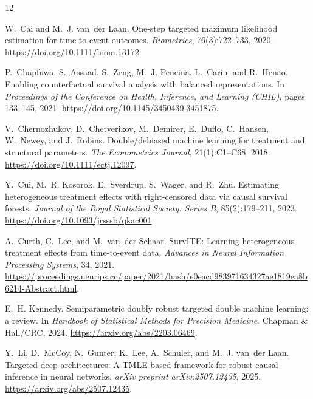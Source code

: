 \documentclass[11pt]{article}
\theoremstyle{remark}
\begin{document}

\begin{thebibliography}{12}

W.~Cai and M.~J. van~der Laan.
\newblock One-step targeted maximum likelihood estimation for time-to-event outcomes.
\newblock \emph{Biometrics}, 76(3):722--733, 2020.
\newblock \url{https://doi.org/10.1111/biom.13172}.

P.~Chapfuwa, S.~Assaad, S.~Zeng, M.~J. Pencina, L.~Carin, and R.~Henao.
\newblock Enabling counterfactual survival analysis with balanced representations.
\newblock In \emph{Proceedings of the Conference on Health, Inference, and Learning (CHIL)}, pages 133--145, 2021.
\newblock \url{https://doi.org/10.1145/3450439.3451875}.

V.~Chernozhukov, D.~Chetverikov, M.~Demirer, E.~Duflo, C.~Hansen, W.~Newey, and J.~Robins.
\newblock Double/debiased machine learning for treatment and structural parameters.
\newblock \emph{The Econometrics Journal}, 21(1):C1--C68, 2018.
\newblock \url{https://doi.org/10.1111/ectj.12097}.

Y.~Cui, M.~R. Kosorok, E.~Sverdrup, S.~Wager, and R.~Zhu.
\newblock Estimating heterogeneous treatment effects with right-censored data via causal survival forests.
\newblock \emph{Journal of the Royal Statistical Society: Series B}, 85(2):179--211, 2023.
\newblock \url{https://doi.org/10.1093/jrsssb/qkac001}.

A.~Curth, C.~Lee, and M.~van~der Schaar.
\newblock SurvITE: Learning heterogeneous treatment effects from time-to-event data.
\newblock \emph{Advances in Neural Information Processing Systems}, 34, 2021.
\newblock \url{https://proceedings.neurips.cc/paper/2021/hash/e0eacd983971634327ae1819ea8b6214-Abstract.html}.

E.~H. Kennedy.
\newblock Semiparametric doubly robust targeted double machine learning: a review.
\newblock In \emph{Handbook of Statistical Methods for Precision Medicine}. Chapman \& Hall/CRC, 2024.
\newblock \url{https://arxiv.org/abs/2203.06469}.

Y.~Li, D.~McCoy, N.~Gunter, K.~Lee, A.~Schuler, and M.~J. van~der Laan.
\newblock Targeted deep architectures: A TMLE-based framework for robust causal inference in neural networks.
\newblock \emph{arXiv preprint arXiv:2507.12435}, 2025.
\newblock \url{https://arxiv.org/abs/2507.12435}.


\end{thebibliography}
\end{document}

